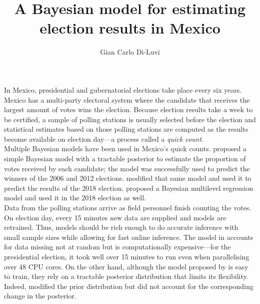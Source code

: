 \documentclass[11pt]{article}
\title{\vspace{-2cm}A Bayesian model for estimating election results in Mexico}
\author{Gian Carlo Di-Luvi}
\date{}
\begin{document}
\maketitle

\vspace{-0.5cm}

In Mexico, presidential and gubernatorial elections take place every six years. Mexico has a multi-party electoral system where the candidate that receives the largest amount of votes wins the election. Because election results take a week to be certified, a sample of polling stations is usually selected before the election and statistical estimates based on those polling stations are computed as the results become available on election day---a process called a \textit{quick count}.
\\



Multiple Bayesian models have been used in Mexico's quick counts. \citet{mendoza-nieto2016} proposed a simple Bayesian model with a tractable posterior to estimate the proportion of votes received by each candidate; the model was successfully used to predict the winners of the 2006 and 2012 elections. \citet{diluvi2018} modified that same model and used it to predict the results of the 2018 election. \citet{anzarut2018} proposed a Bayesian multilevel regression model and used it in the 2018 election as well.
\\




Data from the polling stations arrive as field personnel finish counting the votes. On election day, every 15 minutes new data are supplied and models are retrained. Thus, models should be rich enough to do accurate inference with small sample sizes while allowing for fast online inference. The model in \citep{anzarut2018} accounts for data missing not at random but is computationally expensive---for the presidential election, it took well over 15 minutes to run even when parallelising over 48 CPU cores. On the other hand, although the model proposed by \citep{mendoza-nieto2016} is easy to train, they rely on a tractable posterior distribution that limits its flexibility. Indeed, \citet{diluvi2018} modified the prior distribution but did not account for the corresponding change in the posterior.
\\
\end{document}
